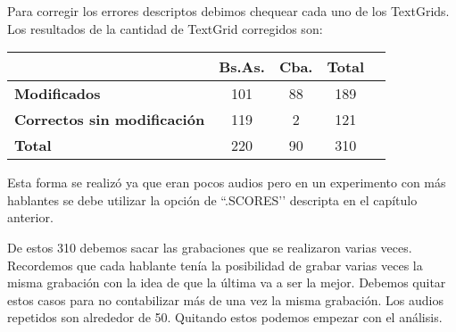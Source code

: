 Para corregir los errores descriptos debimos chequear cada uno de los TextGrids. Los resultados de la cantidad de TextGrid corregidos son:

\begin{table}[h]
\centering
\begin{tabular}{|l|c|c|c|c|}
\hline
\textbf{}  & \textbf{Bs.As. } & \textbf{Cba.} & \textbf{Total} \\ \hline
\textbf{Modificados}  & 101 & 88 & 189 \\ \hline
\textbf{Correctos sin modificación}  & 119 & 2 & 121 \\ \hline
\textbf{Total} & 220 & 90 & 310 \\ \hline
\end{tabular}
\end{table}

Esta forma se realizó ya que eran pocos audios pero en un experimento con más hablantes se debe utilizar la opción de ``.SCORES’’ descripta en el capítulo anterior. 

De estos 310 debemos sacar las grabaciones que se realizaron varias veces. Recordemos que cada hablante tenía la posibilidad de grabar varias veces la misma grabación con la idea de que la última va a ser la mejor. Debemos quitar estos casos para no contabilizar más de una vez la misma grabación. Los audios repetidos son alrededor de 50. Quitando estos podemos empezar con el análisis. 
